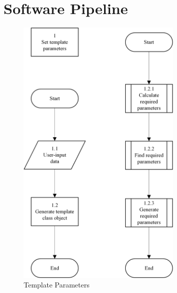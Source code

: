\chapter{Software Pipeline}
\label{chp:softpipe}

\begin{figure}[H]
\centering
	\includegraphics[width=0.7\textwidth]{sp1.png}
	\caption{Template Parameters}
	\label{fig:sp1}
\end{figure}

